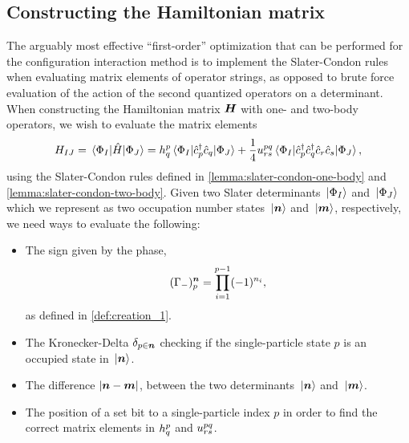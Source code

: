         \subsection{Constructing the Hamiltonian matrix}
            The arguably most effective ``first-order'' optimization that can be
            performed for the configuration interaction method is to implement
            the Slater-Condon rules when evaluating matrix elements of operator
            strings, as opposed to brute force evaluation of the action of the
            second quantized operators on a determinant.
            When constructing the Hamiltonian matrix $\boldsymbol{H}$ with one- and
            two-body operators, we wish to evaluate the matrix elements
            \begin{align}
                H_{IJ}
                = \mel*{\Phi_{I}}{\hat{H}}{\Phi_J}
                =
                h^{p}_{q}
                \mel*{\Phi_{I}}{\hat{c}_{p}^{\dagger}\hat{c}_{q}}{\Phi_J}
                +
                \frac{1}{4}
                u^{pq}_{rs}
                \mel*{\Phi_{I}}{
                    \hat{c}_{p}^{\dagger}
                    \hat{c}_{q}^{\dagger}
                    \hat{c}_{r}
                    \hat{c}_{s}
                }{\Phi_J},
            \end{align}
            using the Slater-Condon rules defined in
            \autoref{lemma:slater-condon-one-body} and
            \autoref{lemma:slater-condon-two-body}.
            Given two Slater determinants $\ket*{\Phi_I}$ and $\ket*{\Phi_J}$
            which we represent as two occupation number states $\ket*{\boldsymbol{n}}$
            and $\ket*{\boldsymbol{m}}$, respectively, we need ways to evaluate the
            following:
            \begin{itemize}
                \item The sign given by the phase,
                    \begin{align}
                        (\Gamma_{-})^{\boldsymbol{n}}_{p}
                        = \prod_{i = 1}^{p - 1}(-1)^{n_i},
                    \end{align}
                    as defined in \autoref{def:creation_1}.
                \item The Kronecker-Delta $\delta_{p \in \boldsymbol{n}}$ checking if
                    the single-particle state $p$ is an occupied state in
                    $\ket*{\boldsymbol{n}}$.
                \item The difference $\abs{\boldsymbol{n} - \boldsymbol{m}}$, between the two
                    determinants $\ket*{\boldsymbol{n}}$ and $\ket*{\boldsymbol{m}}$.
                \item The position of a set bit to a single-particle index $p$
                    in order to find the correct matrix elements in
                    $h^{p}_{q}$ and $u^{pq}_{rs}$.
            \end{itemize}
